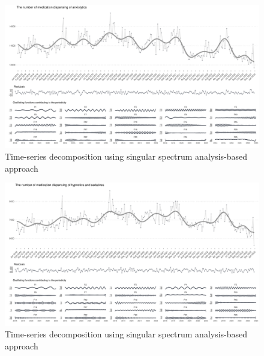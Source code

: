 \documentclass[
  letterpaper,
  DIV=11,
  numbers=noendperiod]{scrartcl}
\begin{document}
\begin{figure}[H]

{\centering \includegraphics[width=1\linewidth,height=\textheight,keepaspectratio]{supplementary_files/figure-pdf/unnamed-chunk-2-15.pdf}

}

\caption{Time-series decomposition using singular spectrum
analysis-based approach}

\end{figure}%

\begin{figure}[H]

{\centering \includegraphics[width=1\linewidth,height=\textheight,keepaspectratio]{supplementary_files/figure-pdf/unnamed-chunk-2-16.pdf}

}

\caption{Time-series decomposition using singular spectrum
analysis-based approach}

\end{figure}%
\end{document}
